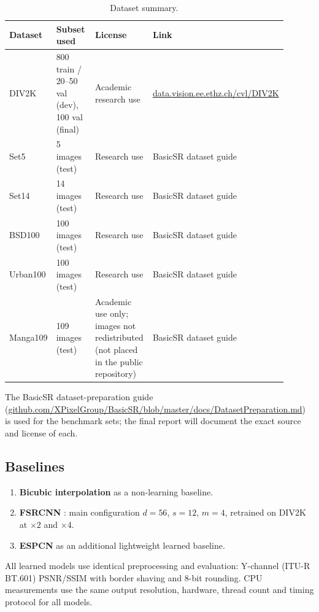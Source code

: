 \documentclass[11pt,a4paper]{article}
\begin{document}
\begin{table}[h]
\centering
\caption{Dataset summary.}
\label{tab:data}
\small
\begin{tabular}{@{}p{0.14\linewidth}p{0.27\linewidth}p{0.27\linewidth}p{0.22\linewidth}@{}}
\toprule
\textbf{Dataset} & \textbf{Subset used} & \textbf{License} & \textbf{Link} \\
\midrule
DIV2K & 800 train / 20--50 val (dev), 100 val (final) &
Academic research use &
\url{data.vision.ee.ethz.ch/cvl/DIV2K} \\
Set5 & 5 images (test) & Research use & BasicSR dataset guide \\
Set14 & 14 images (test) & Research use & BasicSR dataset guide \\
BSD100 & 100 images (test) & Research use & BasicSR dataset guide \\
Urban100 & 100 images (test) & Research use & BasicSR dataset guide \\
Manga109 & 109 images (test) &
Academic use only; images not redistributed (not placed in the public
repository) & BasicSR dataset guide \\
\bottomrule
\end{tabular}
\end{table}

The BasicSR dataset-preparation guide
(\url{github.com/XPixelGroup/BasicSR/blob/master/docs/DatasetPreparation.md})
is used for the benchmark sets; the final report will document the exact
source and license of each.

\subsection{Baselines}

\begin{enumerate}
    \item \textbf{Bicubic interpolation} as a non-learning baseline.
    \item \textbf{FSRCNN} \citep{dong2016fsrcnn}: main configuration
    $d=56$, $s=12$, $m=4$, retrained on DIV2K at $\times2$ and $\times4$.
    \item \textbf{ESPCN} \citep{shi2016espcn} as an additional lightweight
    learned baseline.
\end{enumerate}

All learned models use identical preprocessing and evaluation: Y-channel
(ITU-R BT.601) PSNR/SSIM with border shaving and 8-bit rounding. CPU
measurements use the same output resolution, hardware, thread count and
timing protocol for all models.
\end{document}
